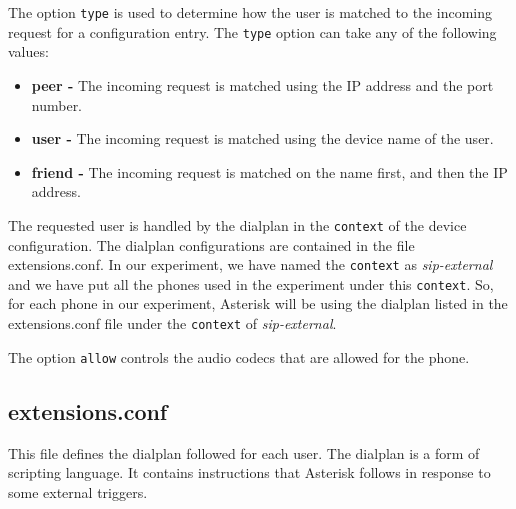 The option \texttt{type} is used to determine how the user is matched to the 
incoming request for a configuration entry. The \texttt{type} option can take any 
of the following values:
\begin{itemize}[noitemsep,topsep=0pt,parsep=0pt,partopsep=0pt]
    \item \textbf{peer -} The incoming request is matched using the IP
    address and the port number.
    \item \textbf{user -} The incoming request is matched using the 
    device name of the user.
    \item \textbf{friend -} The incoming request is matched on the name first,
    and then the IP address.
\end{itemize}

The requested user is handled by the dialplan in the \texttt{context} of the
device configuration. The dialplan configurations are contained in the
file \textsf{extensions.conf}. In our experiment, we have named the
\texttt{context} as \textsl{sip-external} and we have put all the phones used
in the experiment under this \texttt{context}. So, for each phone in our
experiment, Asterisk will be using the dialplan listed in the
\textsf{extensions.conf} file under the \texttt{context} of
\textsl{sip-external}.


The option \texttt{allow} controls the audio codecs that are allowed for the
phone.


\subsection{extensions.conf}

This file defines the dialplan followed for each user. The dialplan is a form
of scripting language. It contains instructions that Asterisk follows in 
response to some external triggers.

